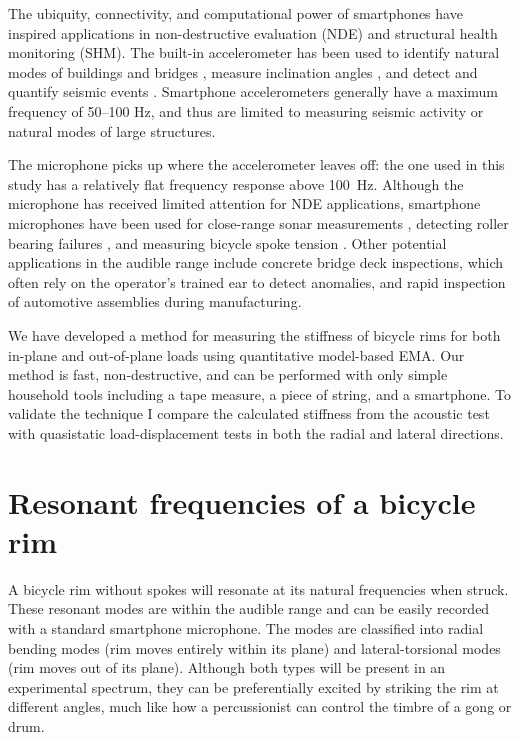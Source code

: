 \documentclass[../thesis.tex]{subfiles}
\begin{document}
The ubiquity, connectivity, and computational power of smartphones have inspired applications in non-destructive evaluation (NDE) and structural health monitoring (SHM). The built-in accelerometer has been used to identify natural modes of buildings and bridges \cite{Feng2015}, measure inclination angles \cite{Morgenthal2012}, and detect and quantify seismic events \cite{Kong2016}. Smartphone accelerometers generally have a maximum frequency of \numrange{50}{100} \si{Hz}, and thus are limited to measuring seismic activity or natural modes of large structures.

The microphone picks up where the accelerometer leaves off: the one used in this study has a relatively flat frequency response above \SI{100}{Hz}. Although the microphone has received limited attention for NDE applications, smartphone microphones have been used for close-range sonar measurements \cite{Morgenthal2012}, detecting roller bearing failures \cite{Grebenik2016}, and measuring bicycle spoke tension \cite{Pepelko2016}. Other potential applications in the audible range include concrete bridge deck inspections, which often rely on the operator's trained ear to detect anomalies, and rapid inspection of automotive assemblies during manufacturing.

We have developed a method for measuring the stiffness of bicycle rims for both in-plane and out-of-plane loads using quantitative model-based EMA. Our method is fast, non-destructive, and can be performed with only simple household tools including a tape measure, a piece of string, and a smartphone. To validate the technique I compare the calculated stiffness from the acoustic test with quasistatic load-displacement tests in both the radial and lateral directions.


\section{Resonant frequencies of a bicycle rim}

A bicycle rim without spokes will resonate at its natural frequencies when struck. These resonant modes are within the audible range and can be easily recorded with a standard smartphone microphone. The modes are classified into radial bending modes (rim moves entirely within its plane) and lateral-torsional modes (rim moves out of its plane). Although both types will be present in an experimental spectrum, they can be preferentially excited by striking the rim at different angles, much like how a percussionist can control the timbre of a gong or drum.
\end{document}
